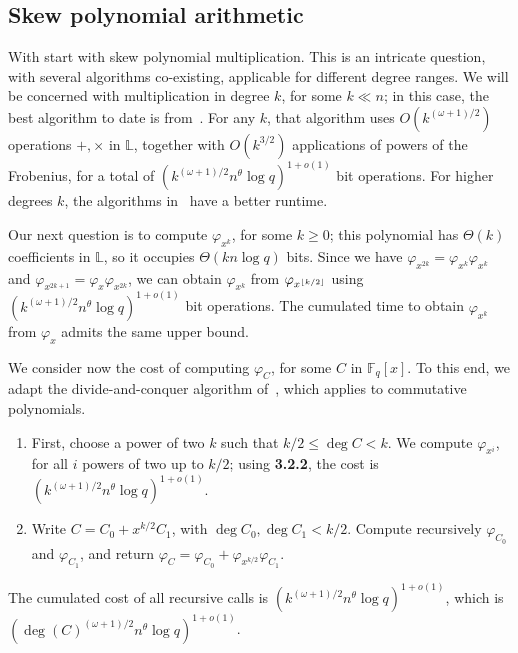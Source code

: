 \documentclass[sigconf]{acmart}
\newcommand{\F}{\mathbb{F}}
\renewcommand{\L}{\mathbb{L}}
\DeclarePairedDelimiter\floor{\lfloor}{\rfloor}
\begin{document}
\subsection{Skew polynomial arithmetic}

\smallskip{}  With start with skew polynomial
multiplication. This is an intricate question, with several
algorithms co-existing, applicable for different degree ranges. We
will be concerned with multiplication in degree $k$,
for some $k \ll n$; in this case, the best algorithm to date is
from~\cite[Th.~7]{PUCHINGER2017b}. For any $k$, that algorithm uses
$O(k^{(\omega+1)/2})$ operations $+,\times$ in $\L$, together with
$O(k^{3/2})$ applications of powers of the Frobenius, for a total of
$(k^{(\omega+1)/2} n^\theta \log q)^{1+o(1)}$ bit operations.
For higher degrees $k$, the algorithms in~\cite{CaLe17} have a better
runtime.


\smallskip{} Our next question is to compute
$\varphi_{x^k}$, for some $k \ge 0$; this polynomial has
$\Theta(k)$ coefficients in $\L$, so it occupies $\Theta(k n \log q)$
bits. Since we have $\varphi_{x^{2k}}=\varphi_{x^{k}}\varphi_{x^{k}}$
and $\varphi_{x^{2k+1}} = \varphi_x\varphi_{x^{2k}}$, we can obtain
$\varphi_{x^k}$ from $\varphi_{x^{\floor*{k/2}}}$ using
$ (k^{(\omega+1)/2} n^\theta \log q)^{1+o(1)}$ bit operations.
The cumulated time to obtain $\varphi_{x^k}$ from $\varphi_x$ admits
the same upper bound.

\smallskip{} We consider now the cost of computing
$\varphi_C$, for some $C$ in $\F_q[x]$. To this end, we adapt the
divide-and-conquer algorithm
of~\cite[Ch.~9]{Gathen:2003:MCA:945759}, which applies to
commutative polynomials.
\begin{enumerate}
\item First, choose a power of two $k$ such that $k/2 \le \deg C <
  k$. We compute $\varphi_{x^i}$, for all $i$ powers of two up to
  $k/2$; using {\bf 3.2.2}, the cost is $(k^{(\omega+1)/2}
  n^\theta\log q)^{1+o(1)}$.
\item Write $C = C_0 + x^{k/2} C_1$, with $\deg C_0,\deg C_1 <
  k/2$. Compute recursively $\varphi_{C_0}$ and $\varphi_{C_1}$, and
  return $\varphi_C = \varphi_{C_0} + \varphi_{x^{k/2}}
  \varphi_{C_1}$.
\end{enumerate}
The cumulated cost of all recursive calls is
$(k^{(\omega+1)/2} n^\theta\log q)^{1+o(1)}$, which is $(\deg
(C)^{(\omega+1)/2} n^\theta\log q)^{1+o(1)}$.
\end{document}
